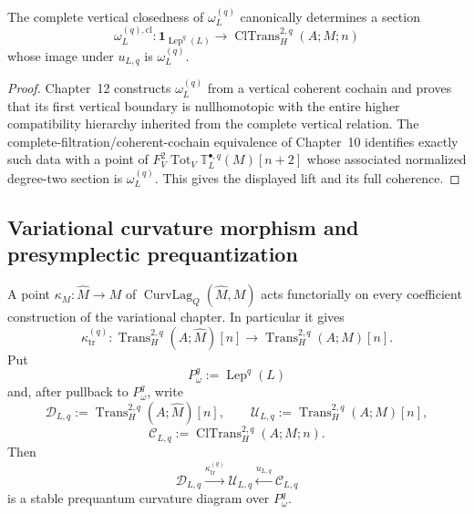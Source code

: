 \begin{proposition}
\label{prop:prequantum-closed-lift-presymplectic-transgression}
The complete vertical closedness of $\omega_L^{(q)}$ canonically determines a
section
\[
\boxed{
\omega_L^{(q),\mathrm{cl}}:
\mathbf1_{\operatorname{Lep}^q(L)}
\longrightarrow
\operatorname{ClTrans}^{2,q}_H(A;M;n)
}
\]
whose image under $u_{L,q}$ is $\omega_L^{(q)}$.
\end{proposition}

\begin{proof}
Chapter~12 constructs $\omega_L^{(q)}$ from a vertical coherent cochain and proves
that its first vertical boundary is nullhomotopic with the entire higher
compatibility hierarchy inherited from the complete vertical relation.  The
complete-filtration/coherent-cochain equivalence of Chapter~10 identifies exactly
such data with a point of
$F_V^2\operatorname{Tot}_V\mathbb T_L^{\bullet,q}(M)[n+2]$ whose associated
normalized degree-two section is $\omega_L^{(q)}$.  This gives the displayed lift
and its full coherence.
\end{proof}

\subsection{Variational curvature morphism and presymplectic prequantization}
\label{subsec:prequantum-variational-curvature-morphism}

A point $\kappa_M:\widehat M\to M$ of
$\operatorname{CurvLag}_Q(\widehat M,M)$ acts functorially on every coefficient
construction of the variational chapter.  In particular it gives
\[
\kappa_{\mathrm{tr}}^{(q)}:
\operatorname{Trans}^{2,q}_H(A;\widehat M)[n]
\longrightarrow
\operatorname{Trans}^{2,q}_H(A;M)[n].
\]
Put
\[
P_\omega^q:=\operatorname{Lep}^q(L)
\]
and, after pullback to $P_\omega^q$, write
\[
\mathscr D_{L,q}
:=
\operatorname{Trans}^{2,q}_H(A;\widehat M)[n],
\qquad
\mathscr U_{L,q}
:=
\operatorname{Trans}^{2,q}_H(A;M)[n],
\]
\[
\mathscr C_{L,q}
:=
\operatorname{ClTrans}^{2,q}_H(A;M;n).
\]
Then
\[
\mathscr D_{L,q}
\xrightarrow{\kappa_{\mathrm{tr}}^{(q)}}
\mathscr U_{L,q}
\xleftarrow{u_{L,q}}
\mathscr C_{L,q}
\]
is a stable prequantum curvature diagram over $P_\omega^q$.

